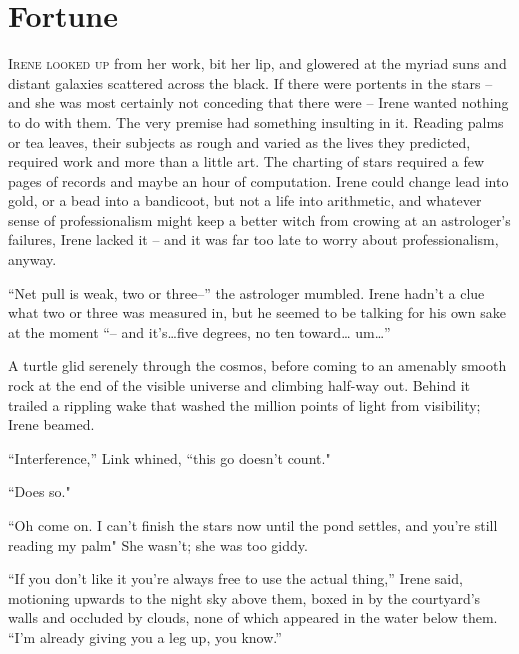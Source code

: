 \documentclass[../FGP.tex]{subfiles}
\begin{document}
\setmarginpargeometry
\section{Fortune}
\noindent \label{sec:fortune}\lettrine[lines=3,loversize=0.039]{I}{rene looked up}
from her work, bit her lip, and glowered at the myriad suns and distant galaxies scattered across the black. If there were portents in the stars -- and she was most certainly not conceding that there were -- Irene wanted nothing to do with them. The very premise had something insulting in it. Reading palms or tea leaves, their subjects as rough and varied as the lives they predicted, required work and more than a little art. The charting of stars required a few pages of records and maybe an hour of computation. Irene could change lead into gold, or a bead into a bandicoot, but not a life into arithmetic, and whatever sense of professionalism might keep a better witch from crowing at an astrologer's failures, Irene lacked it -- and it was far too late to worry about professionalism, anyway.

``Net pull is weak, two or three--'' the astrologer mumbled. Irene hadn't a clue what two or three was measured in, but he seemed to be talking for his own sake at the moment ``-- and it's\ldots five degrees, no ten toward{\ldots} um{\ldots}''

A turtle glid serenely through the cosmos, before coming to an amenably smooth rock at the end of the visible universe and climbing half-way out. Behind it trailed a rippling wake that washed the million points of light from visibility; Irene beamed.

\normalmarginpar``Interference,'' Link whined, ``this go doesn't count."  

``Does so." 

``Oh come on. I can't finish the stars now until the pond settles, and you're still reading my palm" She wasn't; she was too giddy.

``If you don't like it you're always free to use the actual thing,'' Irene said, motioning upwards to the night sky above them, boxed in by the courtyard's walls and occluded by clouds, none of which appeared in the water below them. ``I'm already giving you a leg up, you know.''
\end{document}
